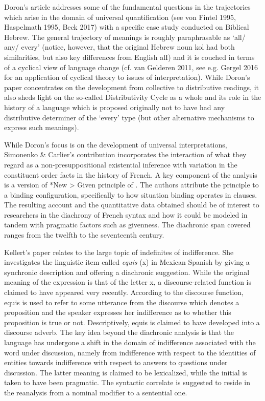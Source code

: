 \documentclass[output=paper]{langsci/langscibook}
\begin{document}
Doron’s article addresses some of the fundamental questions in the trajectories which arise in the domain of universal quantification (see von Fintel 1995, Haspelmath 1995, Beck 2017) with a specific case study conducted on Biblical Hebrew. The general trajectory of meanings is roughly paraphrasable as ‘all/ any/ every’ (notice, however, that the original Hebrew noun kol had both similarities, but also key differences from English alI) and it is couched in terms of a cyclical view of language change (cf. van Gelderen 2011, see e.g. Gergel 2016 for an application of cyclical theory to issues of interpretation). While Doron’s paper concentrates on the development from collective to distributive readings, it also sheds light on the so-called Distributivity Cycle as a whole and its role in the history of a language which is proposed originally not to have had any distributive determiner of the ‘every’ type (but other alternative mechanisms to express such meanings).

While Doron’s focus is on the development of universal interpretations, Simonenko \& Carlier’s contribution incorporates the interaction of what they regard as a non-presuppositional existential inference with variation in the constituent order facts in the history of French. A key component of the analysis is a version of *New > Given principle of \citet{Kucerova2012}. The authors attribute the principle to a binding configuration, specifically to how situation binding operates in clauses. The resulting account and the quantitative data obtained should be of interest to researchers in the diachrony of French syntax and how it could be modeled in tandem with pragmatic factors such as givenness. The diachronic span covered ranges from the twelfth to the seventeenth century.

Kellert’s paper relates to the large topic of indefinites of indifference. She investigates the linguistic item called \textit {equis} (x) in Mexican Spanish by giving a synchronic description and offering a diachronic suggestion. While the original meaning of the expression is that of the letter x, a discourse-related function is claimed to have appeared very recently.  According to the discourse function, equis is used to refer to some utterance from the discourse which denotes a proposition and the speaker expresses her indifference as to whether this proposition is true or not. Descriptively, equis is claimed to have developed into a discourse adverb. The key idea beyond the diachronic analysis is that the language has undergone a shift in the domain of indifference associated with the word under discussion, namely from indifference with respect to the identities of entities towards indifference with respect to answers to questions under discussion. The latter meaning is claimed to be lexicalized, while the initial is taken to have been pragmatic. The syntactic correlate is suggested to reside in the reanalysis from a nominal modifier to a sentential one.
\end{document}
